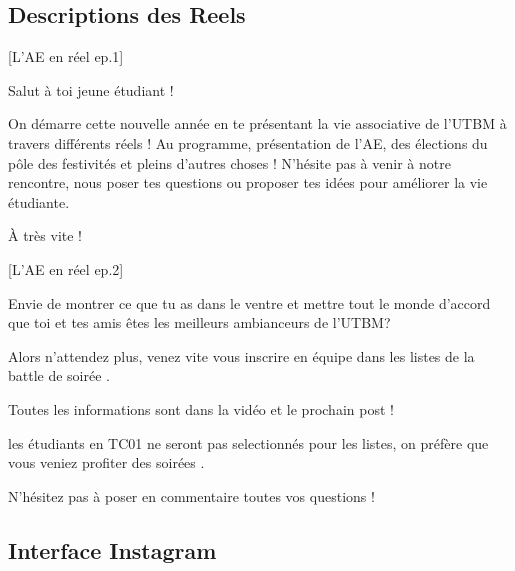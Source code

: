 


\subsection*{Descriptions des Reels}\label{subsec:descriptions-reels}



[L'\gls{AE} en réel ep.1]

\noindent Salut à toi jeune étudiant !

\noindent On démarre cette nouvelle année en te présentant la vie associative de l'\gls{UTBM} à travers différents réels !
\noindent Au programme, présentation de l'\gls{AE}, des élections du pôle des festivités et pleins d'autres choses !
\noindent N'hésite pas à venir à notre rencontre, nous poser tes questions ou proposer tes idées pour améliorer la vie étudiante.

\noindent À très vite !


[L'\gls{AE} en réel ep.2]

\noindent Envie de montrer ce que tu as dans le ventre et mettre tout le monde d'accord que toi et tes amis êtes les meilleurs ambianceurs de l'\gls{UTBM}? 

\noindent Alors n'attendez plus, venez vite vous inscrire en équipe dans les listes de la battle de soirée .

\noindent Toutes les informations sont dans la vidéo et le prochain post  !

\noindent {} les étudiants en TC01 ne seront pas selectionnés pour les listes, on préfère que vous veniez profiter des soirées .

\noindent N'hésitez pas à poser en commentaire toutes vos questions !


\subsection*{Interface Instagram}\label{subsec:interface-instagram}

